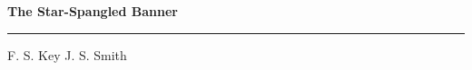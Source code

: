 \documentclass[10pt]{book}
\begin{document}
{
  \samepage
  \raggedbottom
  \raggedright
  \sloppy


  \vspace{0.2in}

  \noindent\begin{minipage}{.1\textwidth}
    \hfill\vspace{0.1in}
  \end{minipage}%
  \noindent\begin{minipage}{.8\textwidth}
    \centering
    \bfseries
    \large The Star-Spangled Banner
  \end{minipage}%
  \noindent\begin{minipage}{.1\textwidth}
      \hfill\vspace{0.1in}
  \end{minipage}

  \nopagebreak[4]
  \vspace{0.1in}
  \nopagebreak[4]
  \hrule height 0.05ex
  \nopagebreak[4]
  \vspace{-0.05in}

  {\footnotesize F. S. Key \hfill J. S. Smith }\\
  \vspace{0.01in}



}
\end{document}
